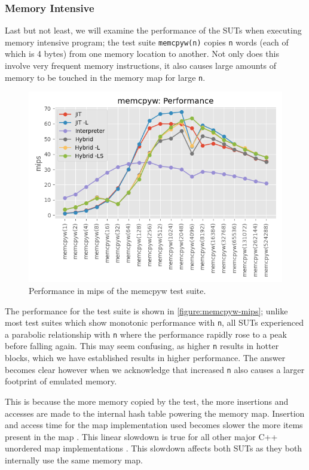 \subsubsection{Memory Intensive}
\label{section:perf-memory}

Last but not least, we will examine the performance of the SUTs when executing memory intensive program; the test suite \texttt{memcpyw(n)} copies \texttt{n} words (each of which is 4 bytes) from one memory location to another. Not only does this involve very frequent memory instructions, it also causes large amounts of memory to be touched in the memory map for large \texttt{n}.

\begin{figure}[H]
    \centering
    \includegraphics[scale=0.75]{output/graphs/tests/all/memcpyw/mips.png}
    \caption{Performance in mips of the memcpyw test suite.}
    \label{figure:memcpyw-mips}
\end{figure}

The performance for the test suite is shown in \autoref{figure:memcpyw-mips}; unlike most test suites which show monotonic performance with \texttt{n}, all SUTs experienced a parabolic relationship with \texttt{n} where the performance rapidly rose to a peak before falling again. This may seem confusing, as higher \texttt{n} results in hotter blocks, which we have established results in higher performance. The answer becomes clear however when we acknowledge that increased \texttt{n} also causes a larger footprint of emulated memory.

This is because the more memory copied by the test, the more insertions and accesses are made to the internal hash table powering the memory map. Insertion and access time for the map implementation used becomes slower the more items present in the map \cite{tessil-benchmark}. This linear slowdown is true for all other major C++ unordered map implementations \cite{tessil-benchmark}. This slowdown affects both SUTs as they both internally use the same memory map.

